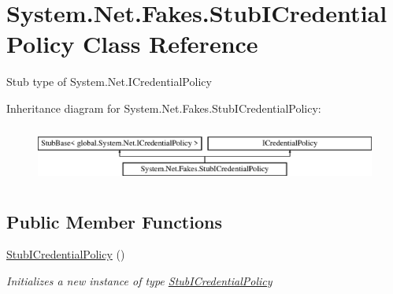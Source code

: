 \hypertarget{class_system_1_1_net_1_1_fakes_1_1_stub_i_credential_policy}{\section{System.\-Net.\-Fakes.\-Stub\-I\-Credential\-Policy Class Reference}
\label{class_system_1_1_net_1_1_fakes_1_1_stub_i_credential_policy}
}


Stub type of System.\-Net.\-I\-Credential\-Policy 


Inheritance diagram for System.\-Net.\-Fakes.\-Stub\-I\-Credential\-Policy\-:\begin{figure}[H]
\begin{center}
\leavevmode
\includegraphics[height=1.879195cm]{class_system_1_1_net_1_1_fakes_1_1_stub_i_credential_policy}
\end{center}
\end{figure}
\subsection*{Public Member Functions}
\begin{DoxyCompactItemize}
\item 
\hyperlink{class_system_1_1_net_1_1_fakes_1_1_stub_i_credential_policy_ab79cfcd8b0092474c11e28a4ea74eb94}{Stub\-I\-Credential\-Policy} ()
\begin{DoxyCompactList}\small\item\em Initializes a new instance of type \hyperlink{class_system_1_1_net_1_1_fakes_1_1_stub_i_credential_policy}{Stub\-I\-Credential\-Policy}\end{DoxyCompactList}\end{DoxyCompactItemize}
